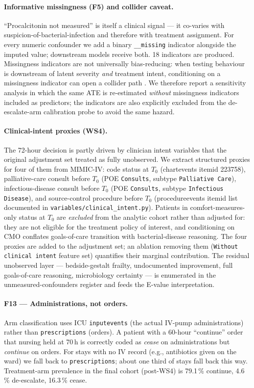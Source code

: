 \documentclass[11pt,a4paper]{article}
\begin{document}
\paragraph{Informative missingness (F5) and collider caveat.} ``Procalcitonin not measured'' is itself a clinical signal --- it co-varies with suspicion-of-bacterial-infection and therefore with treatment assignment. For every numeric confounder we add a binary \texttt{\_\_missing} indicator alongside the imputed value; downstream models receive both. 18 indicators are produced. Missingness indicators are not universally bias-reducing: when testing behaviour is downstream of latent severity \emph{and} treatment intent, conditioning on a missingness indicator can open a collider path \cite{groenwold2020missingness}. We therefore report a sensitivity analysis in which the same ATE is re-estimated \emph{without} missingness indicators included as predictors; the indicators are also explicitly excluded from the de-escalate-arm calibration probe to avoid the same hazard.

\paragraph{Clinical-intent proxies (WS4).} The 72-hour decision is partly driven by clinician intent variables that the original adjustment set treated as fully unobserved. We extract structured proxies for four of them from MIMIC-IV: code status at $T_0$ (chartevents itemid 223758), palliative-care consult before $T_0$ (POE \texttt{Consults}, subtype \texttt{Palliative Care}), infectious-disease consult before $T_0$ (POE \texttt{Consults}, subtype \texttt{Infectious Disease}), and source-control procedure before $T_0$ (procedureevents itemid list documented in \texttt{variables/clinical\_intent.py}). Patients in comfort-measures-only status at $T_0$ are \emph{excluded} from the analytic cohort rather than adjusted for: they are not eligible for the treatment policy of interest, and conditioning on CMO conflates goals-of-care transition with bacterial-disease reasoning. The four proxies are added to the adjustment set; an ablation removing them (\texttt{Without clinical intent} feature set) quantifies their marginal contribution. The residual unobserved layer --- bedside-gestalt frailty, undocumented improvement, full goals-of-care reasoning, microbiology certainty --- is enumerated in the unmeasured-confounders register and feeds the E-value interpretation.

\paragraph{F13 --- Administrations, not orders.} Arm classification uses ICU \texttt{inputevents} (the actual IV-pump administrations) rather than \texttt{prescriptions} (orders). A patient with a 60-hour ``continue'' order that nursing held at 70\,h is correctly coded as \emph{cease} on administrations but \emph{continue} on orders. For stays with no IV record (e.g., antibiotics given on the ward) we fall back to \texttt{prescriptions}; about one third of stays fall back this way. Treatment-arm prevalence in the final cohort (post-WS4) is 79.1\,\% continue, 4.6\,\% de-escalate, 16.3\,\% cease.
\end{document}
